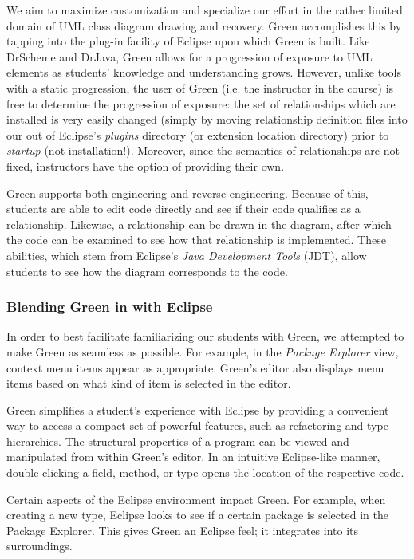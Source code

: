 \documentclass{sig-alt-release}
\begin{document}
    We aim to maximize customization and specialize our effort in the rather
    limited domain of UML class diagram drawing and recovery. Green accomplishes
    this by tapping into the plug-in facility of Eclipse upon which Green is
    built. Like DrScheme and DrJava, Green allows for a progression of exposure
    to UML elements as students' knowledge and understanding grows. However,
    unlike tools with a static progression, the user of Green (i.e. the
    instructor in the course) is free to determine the progression of exposure:
    the set of relationships which are installed is very easily changed (simply
    by moving relationship definition files into our out of Eclipse's
    \emph{plugins} directory (or extension location directory) prior to
    \emph{startup} (not installation!). Moreover, since the semantics of
    relationships are not fixed, instructors have the option of providing their
    own.

    Green supports both engineering and reverse-engineering. Because of this,
    students are able to edit code directly and see if their code qualifies as a
    relationship. Likewise, a relationship can be drawn in the diagram, after
    which the code can be examined to see how that relationship is implemented.
    These abilities, which stem from Eclipse's \emph{Java Development Tools}
    (JDT), allow students to see how the diagram corresponds to the code.

    \subsubsection{Blending Green in with Eclipse}
      In order to best facilitate familiarizing our students with Green, we
      attempted to make Green as seamless as possible. For example, in the
      \emph{Package Explorer} view, context menu items appear as appropriate.
      Green's editor also displays menu items based on what kind of item is
      selected in the editor.

      Green simplifies a student's experience with Eclipse by providing a
      convenient way to access a compact set of powerful features, such as
      refactoring and type hierarchies. The structural properties of a program
      can be viewed and manipulated from within Green's editor. In an intuitive
      Eclipse-like manner, double-clicking a field, method, or type opens the
      location of the respective code.

      Certain aspects of the Eclipse environment impact Green. For example, when
      creating a new type, Eclipse looks to see if a certain package is selected
      in the Package Explorer. This gives Green an Eclipse feel; it integrates
      into its surroundings.
\end{document}
